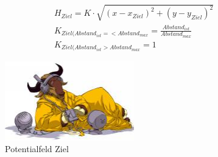 \begin{align}
H_{Ziel}= K \cdot \sqrt{(x-x_{Ziel})^2+(y-y_{Ziel})^2} \\
K_{Ziel(Abstand_{ist} =< Abstand_{max}}=\frac{Abstand_{ist}}{Abstand_{max}}\\
K_{Ziel(Abstand_{ist} > Abstand_{max}}=1
 \end{align}
 
\begin{figure}
	\centering	\includegraphics[width=0.5\textwidth]{grafiken/listen-tiny.jpg}
	\caption{Potentialfeld Ziel}
	\label{fig:PotZiel}
\end{figure}